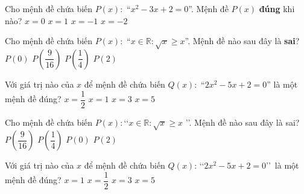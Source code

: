 \begin{ex}%
	Cho mệnh  đề chứa biến $P\left(x\right)\colon$ ``$x^2-3x+2=0$''. Mệnh đề $P\left(x\right)$ \textbf{đúng} khi nào?
	 \choice
		 {$x=0$}
		 {\True $x=1$}
		{$x=-1$} 
		 {$x=-2$}
\end{ex}

\begin{ex}%
	Cho mệnh đề chứa biến  $P(x)\colon$ ``$x\in\mathbb{R}\colon \sqrt{x}\ge x$''. Mệnh đề nào sau đây là \textbf{sai}?
	 \choice
		 {$P(0)$}
		 {$P\left(\dfrac{9}{16}\right)$}
		{$P\left(\dfrac{1}{4}\right)$} 
		{\True $P(2)$} 
\end{ex}

\begin{ex}%
	Với giá trị nào của $x$ để mệnh đề chứa biến $Q(x)\colon$ ``$2x^2-5x+2=0$''  là một mệnh đề đúng?
	 \choice
		 {\True $x=\dfrac{1}{2}$}
		 {$x=1$}
		{$x=3$} 
		{$x=5$} 
\end{ex}

\begin{ex}%
	Cho mệnh đề chứa biến $P(x): $\lq\lq $ x  \in \mathbb{R} : \sqrt{x} \geq x$ \rq\rq. Mệnh đề nào sau đây là sai?
	 \choice
		 {$P\left(\dfrac{9}{16}\right)$}
		{$P\left(\dfrac{1}{4}\right)$} 
		 {$P(0)$}
		{\True $P(2)$} 
\end{ex}

\begin{ex}%
	Với giá trị nào của $x$ để mệnh đề chứa biến $Q(x)$: \lq\lq $2x^2-5x+2=0$\rq\rq\, là một mệnh  đề đúng?
	\choice 
		{$x=1$} 
		{\True  $x=\dfrac{1}{2}$}
		{$x=3$} 
		 {$x=5$}
\end{ex}

